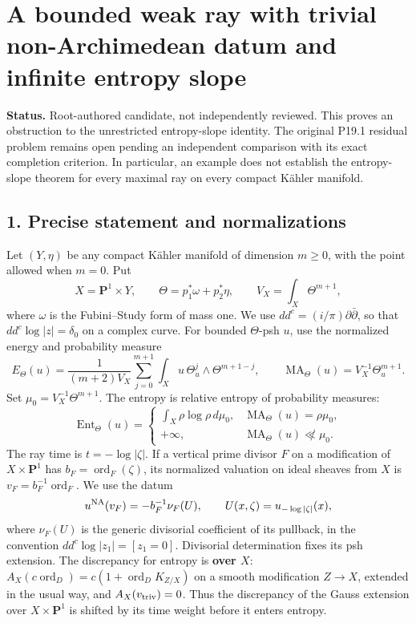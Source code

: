\documentclass[
]{article}
\author{}
\date{}
\begin{document}
\section{A bounded weak ray with trivial non-Archimedean datum and
infinite entropy
slope}\label{a-bounded-weak-ray-with-trivial-non-archimedean-datum-and-infinite-entropy-slope}

\textbf{Status.} Root-authored candidate, not independently reviewed.
This proves an obstruction to the unrestricted entropy-slope identity.
The original P19.1 residual problem remains open pending an independent
comparison with its exact completion criterion. In particular, an
example does not establish the entropy-slope theorem for every maximal
ray on every compact Kähler manifold.

\subsection{1. Precise statement and
normalizations}\label{precise-statement-and-normalizations}

Let \((Y,\eta)\) be any compact Kähler manifold of dimension \(m\geq0\),
with the point allowed when \(m=0\). Put \[
 X=\mathbf P^1\times Y,\qquad
 \Theta=p_1^*\omega+p_2^*\eta,\qquad
 V_X=\int_X\Theta^{m+1},
\] where \(\omega\) is the Fubini--Study form of mass one. We use
\(dd^c=(i/\pi)\partial\bar\partial\), so that \(dd^c\log|z|=\delta_0\)
on a complex curve. For bounded \(\Theta\)-psh \(u\), use the normalized
energy and probability measure \[
 E_\Theta(u)=\frac{1}{(m+2)V_X}
 \sum_{j=0}^{m+1}\int_Xu\,\Theta_u^j\wedge\Theta^{m+1-j},
 \qquad \operatorname{MA}_\Theta(u)=V_X^{-1}\Theta_u^{m+1}.
\] Set \(\mu_0=V_X^{-1}\Theta^{m+1}\). The entropy is relative entropy
of probability measures: \[
 \operatorname{Ent}_\Theta(u)=
 \begin{cases}\int_X\rho\log\rho\,d\mu_0,&\operatorname{MA}_\Theta(u)=\rho\mu_0,\\
 +\infty,&\operatorname{MA}_\Theta(u)\not\ll\mu_0.
 \end{cases}
\] The ray time is \(t=-\log|\zeta|\). If a vertical prime divisor \(F\)
on a modification of \(X\times\mathbf P^1\) has
\(b_F=\operatorname{ord}_F(\zeta)\), its normalized valuation on ideal
sheaves from \(X\) is \(v_F=b_F^{-1}\operatorname{ord}_F\). We use the
datum \[
 u^{\rm NA}(v_F)=-b_F^{-1}\nu_F(U),\qquad U(x,\zeta)=u_{-\log|\zeta|}(x),
\] where \(\nu_F(U)\) is the generic divisorial coefficient of its
pullback, in the convention \(dd^c\log|z_1|=[z_1=0]\). Divisorial
determination fixes its psh extension. The discrepancy for entropy is
\textbf{over \(X\)}:
\(A_X(c\operatorname{ord}_D)=c(1+\operatorname{ord}_D K_{Z/X})\) on a
smooth modification \(Z\to X\), extended in the usual way, and
\(A_X(v_{\rm triv})=0\). Thus the discrepancy of the Gauss extension
over \(X\times\mathbf P^1\) is shifted by its time weight before it
enters entropy.
\end{document}
